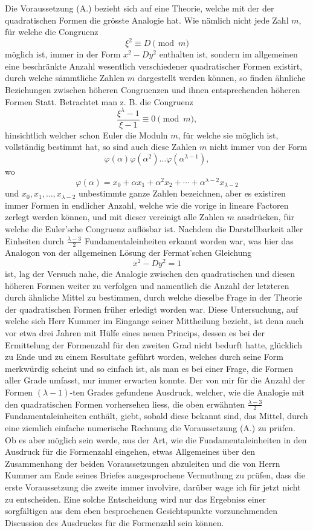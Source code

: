 \documentclass[11pt]{article}
\begin{document}
Die Voraussetzung (A.) bezieht sich auf eine Theorie, welche mit der der quadratischen Formen die grösste Analogie hat. Wie nämlich nicht jede Zahl $m$, für welche die Congruenz
\[
\xi^2 \equiv D \pmod{m}
\]
möglich ist, immer in der Form $x^2-Dy^2$ enthalten ist, sondern im allgemeinen eine beschränkte Anzahl wesentlich verschiedener quadratischer Formen existirt, durch welche sämmtliche Zahlen $m$ dargestellt werden können, so finden ähnliche Beziehungen zwischen höheren Congruenzen und ihnen entsprechenden höheren Formen Statt. Betrachtet man z. B. die Congruenz
\[
\frac{\xi^\lambda-1}{\xi-1}\equiv 0 \pmod{m},
\]
hinsichtlich welcher schon Euler die Moduln $m$, für welche sie möglich ist, vollständig bestimmt hat, so sind auch diese Zahlen $m$ nicht immer von der Form
\[
\varphi(\alpha)\varphi(\alpha^2)\ldots\varphi(\alpha^{\lambda-1}),
\]
wo
\[
\varphi(\alpha)=x_0+\alpha x_1+\alpha^2x_2+\cdots+\alpha^{\lambda-2}x_{\lambda-2}
\]
und $x_0,x_1,\ldots,x_{\lambda-2}$ unbestimmte ganze Zahlen bezeichnen, aber es existiren immer Formen in endlicher Anzahl, welche wie die vorige in lineare Factoren zerlegt werden können, und mit dieser vereinigt alle Zahlen $m$ ausdrücken, für welche die Euler'sche Congruenz auflösbar ist. Nachdem die Darstellbarkeit aller Einheiten durch $\frac{\lambda-3}{2}$ Fundamentaleinheiten erkannt worden war, was hier das Analogon von der allgemeinen Lösung der Fermat'schen Gleichung
\[
x^2-Dy^2=1
\]
ist, lag der Versuch nahe, die Analogie zwischen den quadratischen und diesen höheren Formen weiter zu verfolgen und namentlich die Anzahl der letzteren durch ähnliche Mittel zu bestimmen, durch welche dieselbe Frage in der Theorie der quadratischen Formen früher erledigt worden war. Diese Untersuchung, auf welche sich Herr Kummer im Eingange seiner Mittheilung bezieht, ist denn auch vor etwa drei Jahren mit Hülfe eines neuen Princips, dessen es bei der Ermittelung der Formenzahl für den zweiten Grad nicht bedurft hatte, glücklich zu Ende und zu einem Resultate geführt worden, welches durch seine Form merkwürdig scheint und so einfach ist, als man es bei einer Frage, die Formen aller Grade umfasst, nur immer erwarten konnte. Der von mir für die Anzahl der Formen $(\lambda-1)$-ten Grades gefundene Ausdruck, welcher, wie die Analogie mit den quadratischen Formen vorhersehen liess, die oben erwähnten $\frac{\lambda-3}{2}$ Fundamentaleinheiten enthält, giebt, sobald diese bekannt sind, das Mittel, durch eine ziemlich einfache numerische Rechnung die Voraussetzung (A.) zu prüfen. Ob es aber möglich sein werde, aus der Art, wie die Fundamentaleinheiten in den Ausdruck für die Formenzahl eingehen, etwas Allgemeines über den Zusammenhang der beiden Voraussetzungen abzuleiten und die von Herrn Kummer am Ende seines Briefes ausgesprochene Vermuthung zu prüfen, dass die erste Voraussetzung die zweite immer involvire, darüber wage ich für jetzt nicht zu entscheiden. Eine solche Entscheidung wird nur das Ergebniss einer sorgfältigen aus dem eben besprochenen Gesichtspunkte vorzunehmenden Discussion des Ausdruckes für die Formenzahl sein können.
\end{document}
